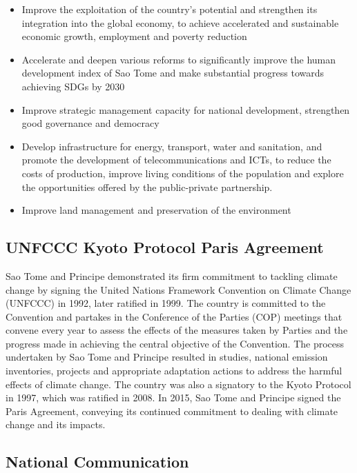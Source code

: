 \documentclass[
]{book}
\providecommand{\tightlist}{%
  \setlength{\itemsep}{0pt}\setlength{\parskip}{0pt}}
\begin{document}
\begin{itemize}
\tightlist
\item
  Improve the exploitation of the country's potential and strengthen its integration into the global economy, to achieve accelerated and sustainable economic growth, employment and poverty reduction
\item
  Accelerate and deepen various reforms to significantly improve the human development index of Sao Tome and make substantial progress towards achieving SDGs by 2030
\item
  Improve strategic management capacity for national development, strengthen good governance and democracy
\item
  Develop infrastructure for energy, transport, water and sanitation, and promote the development of telecommunications and ICTs, to reduce the costs of production, improve living conditions of the population and explore the opportunities offered by the public-private partnership.
\item
  Improve land management and preservation of the environment
\end{itemize}

\hypertarget{unfccc-kyoto-protocol-paris-agreement}{%
\subsection{UNFCCC \textbar{} Kyoto Protocol \textbar{} Paris Agreement}\label{unfccc-kyoto-protocol-paris-agreement}}

Sao Tome and Principe demonstrated its firm commitment to tackling climate change by signing the United Nations Framework Convention on Climate Change (UNFCCC) in 1992, later ratified in 1999. The country is committed to the Convention and partakes in the Conference of the Parties (COP) meetings that convene every year to assess the effects of the measures taken by Parties and the progress made in achieving the central objective of the Convention. The process undertaken by Sao Tome and Principe resulted in studies, national emission inventories, projects and appropriate adaptation actions to address the harmful effects of climate change. The country was also a signatory to the Kyoto Protocol in 1997, which was ratified in 2008. In 2015, Sao Tome and Principe signed the Paris Agreement, conveying its continued commitment to dealing with climate change and its impacts.

\hypertarget{national-communication}{%
\subsection{National Communication}\label{national-communication}}
\end{document}
